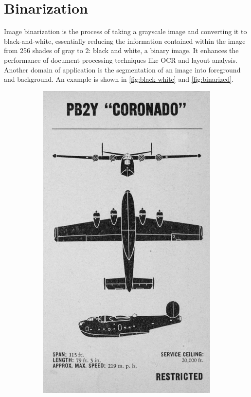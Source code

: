 \documentclass[paper=a4, fontsize=10pt]{scrartcl}	%
\begin{document}
	\section{Binarization}

	Image binarization is the process of taking a grayscale image and converting it to black-and-white, essentially reducing the information contained within the image from 256 shades of gray to 2: black and white, a binary image. It enhances the 
	performance of document processing techniques like OCR and layout analysis. Another domain of application is the segmentation of an image into foreground and background. An example is shown in \autoref{fig:black-white} and \autoref{fig:binarized}.

	\begin{figure}[H]
		\begin{subfigure}{.5\textwidth}
			\centering
			\includegraphics[width=0.8\linewidth]{images/binarization/bw.jpeg}

\end{subfigure}
\end{figure}
\end{document}
